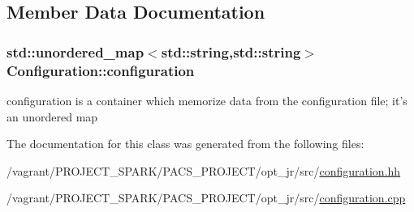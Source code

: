 \subsection{Member Data Documentation}
\hypertarget{classConfiguration_ab79bfcdc7339715a56a5a2f4a069bdda}{
\subsubsection[{configuration}]{\setlength{\rightskip}{0pt plus 5cm}std\-::unordered\-\_\-map$<$std\-::string,std\-::string$>$ Configuration\-::configuration\hspace{0.3cm}{\ttfamily [private]}}}\label{classConfiguration_ab79bfcdc7339715a56a5a2f4a069bdda}
configuration is a container which memorize data from the configuration file; it's an unordered map 

The documentation for this class was generated from the following files\-:\begin{DoxyCompactItemize}
\item 
/vagrant/\-P\-R\-O\-J\-E\-C\-T\-\_\-\-S\-P\-A\-R\-K/\-P\-A\-C\-S\-\_\-\-P\-R\-O\-J\-E\-C\-T/opt\-\_\-jr/src/\hyperlink{configuration_8hh}{configuration.\-hh}\item 
/vagrant/\-P\-R\-O\-J\-E\-C\-T\-\_\-\-S\-P\-A\-R\-K/\-P\-A\-C\-S\-\_\-\-P\-R\-O\-J\-E\-C\-T/opt\-\_\-jr/src/\hyperlink{configuration_8cpp}{configuration.\-cpp}\end{DoxyCompactItemize}
